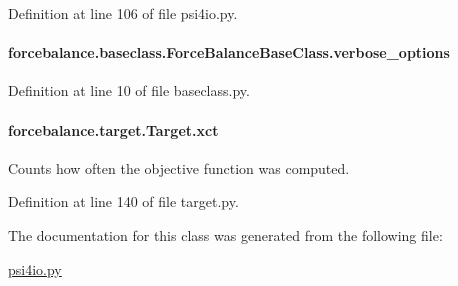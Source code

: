 Definition at line 106 of file psi4io.\-py.

\hypertarget{classforcebalance_1_1baseclass_1_1ForceBalanceBaseClass_a8088e1e20cbd6bc175fb9c9fe9fa0f18}{
\paragraph[{verbose\-\_\-options}]{\setlength{\rightskip}{0pt plus 5cm}forcebalance.\-baseclass.\-Force\-Balance\-Base\-Class.\-verbose\-\_\-options\hspace{0.3cm}{\ttfamily [inherited]}}}\label{classforcebalance_1_1baseclass_1_1ForceBalanceBaseClass_a8088e1e20cbd6bc175fb9c9fe9fa0f18}


Definition at line 10 of file baseclass.\-py.

\hypertarget{classforcebalance_1_1target_1_1Target_aad2e385cfbf7b4a68f1c2cb41133fe82}{
\paragraph[{xct}]{\setlength{\rightskip}{0pt plus 5cm}forcebalance.\-target.\-Target.\-xct\hspace{0.3cm}{\ttfamily [inherited]}}}\label{classforcebalance_1_1target_1_1Target_aad2e385cfbf7b4a68f1c2cb41133fe82}


Counts how often the objective function was computed. 



Definition at line 140 of file target.\-py.



The documentation for this class was generated from the following file\-:\begin{DoxyCompactItemize}
\item 
\hyperlink{psi4io_8py}{psi4io.\-py}\end{DoxyCompactItemize}
